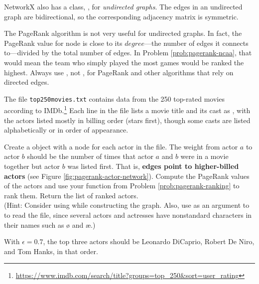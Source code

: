 \begin{warn} %
NetworkX also has a class, , for \emph{undirected graphs}.
The edges in an undirected graph are bidirectional, so the corresponding adjacency matrix is symmetric.

The PageRank algorithm is not very useful for undirected graphs.
In fact, the PageRank value for node is close to its $degree$---the number of edges it connects to---divided by the total number of edges.
In Problem \ref{prob:pagerank-ncaa}, that would mean the team who simply played the most games would be ranked the highest.
Always use , not , for PageRank and other algorithms that rely on directed edges.
\end{warn}

\begin{problem} %
The file \texttt{top250movies.txt} contains data from the 250 top-rated movies according to IMDb.\footnote{\url{https://www.imdb.com/search/title?groups=top_250&sort=user_rating}}
Each line in the file lists a movie title and its cast as
,
with the actors listed mostly in billing order (stars first), though some casts are listed alphabetically or in order of appearance.

Create a  object with a node for each actor in the file.
The weight from actor $a$ to actor $b$ should be the number of times that actor $a$ and $b$ were in a movie together but actor $b$ was listed first.
That is, \textbf{edges point to higher-billed actors} (see Figure \ref{fig:pagerank-actor-network}).
Compute the PageRank values of the actors and use your function from Problem \ref{prob:pagerank-ranking} to rank them.
Return the list of ranked actors.
\\(Hint: Consider using  while constructing the graph.
Also, use  as an argument to  to read the file, since several actors and actresses have nonstandard characters in their names such as {\o} and {\ae}.)

With $\epsilon = 0.7$, the top three actors should be Leonardo DiCaprio, Robert De Niro, and Tom Hanks, in that order.
\label{prob:pagerank-actors}
\end{problem}

